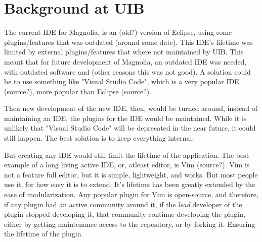 \begin{center}
  
\end{center}

\begin{center}
  
\end{center}

\section{Background at UIB}

The current IDE for Magnolia, is an (old?) version of Eclipse, using some
plugins/features that was outdated (around some date). This IDE's lifetime was
limited by external plugins/features that where not maintained by UIB. This
meant that for future development of Magnolia, an outdated IDE was needed, with
outdated software and (other reasons this was not good). A solution could be to
use something like "Visual Studio Code", which is a very popular IDE (source?),
more popular than Eclipse (source?).

Then new development of the new IDE, then, would be turned around, instead of
maintaining an IDE, the plugins for the IDE would be maintained. While it is
unlikely that "Visual Studio Code" will be deprecated in the near future, it
could still happen. The best solution is to keep everything internal.

But creating any IDE would still limit the lifetime of the application. The best
example of a long living active IDE, or, atleast editor, is Vim (source?). Vim
is not a feature full editor, but it is simple, lightweight, and works. But most
people use it, for how easy it is to extend; It's lifetime has been greatly
extended by the ease of modularization. Any popular plugin for Vim is
open-source, and therefore, if any plugin had an active community around it, if
the \textit{lead} developer of the plugin stopped developing it, that community
continue developing the plugin, either by getting maintenance access to the
repository, or by forking it. Ensuring the lifetime of the plugin.

